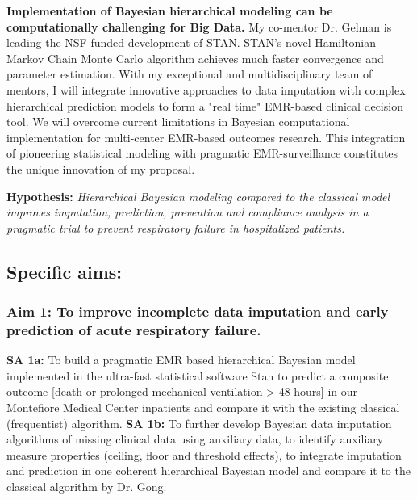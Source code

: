 \documentclass[11pt,notitlepage]{article}
\begin{document}
\newline \textbf{Implementation of Bayesian hierarchical modeling can be computationally challenging for Big Data.} My co-mentor Dr. Gelman is leading the NSF-funded development of STAN. STAN's novel Hamiltonian Markov Chain Monte Carlo algorithm achieves much faster convergence and parameter estimation. With my exceptional and multidisciplinary team of mentors, I will integrate innovative approaches to data imputation with complex hierarchical prediction models to form a "real time" EMR-based clinical decision tool. We will overcome current limitations in Bayesian computational implementation for multi-center EMR-based outcomes research. This integration of pioneering statistical modeling with pragmatic EMR-surveillance constitutes the unique innovation of my proposal.

\begin{flushleft}
\textbf{Hypothesis:} \textit{Hierarchical Bayesian modeling compared to the classical model improves imputation, prediction, prevention and compliance analysis in a pragmatic trial to prevent respiratory failure in hospitalized patients.}
\end{flushleft}

\subsection*{Specific aims:}

\subsubsection*{Aim 1: To improve incomplete data imputation and early prediction of acute respiratory failure.}
\textbf{SA 1a:} To build a pragmatic EMR based hierarchical Bayesian model implemented in the ultra-fast statistical software Stan to predict a composite outcome [death or prolonged mechanical ventilation > 48 hours] in our Montefiore Medical Center inpatients and compare it with the existing classical (frequentist) algorithm. \newline \textbf{SA 1b:} To further develop Bayesian data imputation algorithms of missing clinical data using auxiliary data, to identify auxiliary measure properties (ceiling, floor and threshold effects), to integrate imputation and prediction in one coherent hierarchical Bayesian model and compare it to the classical algorithm by Dr. Gong.
\end{document}
